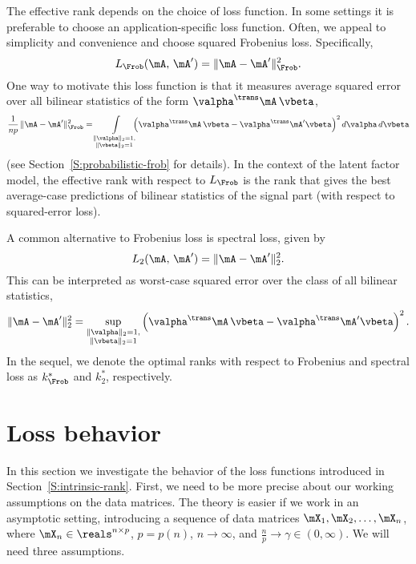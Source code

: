 The effective rank depends on the choice of loss function.  In some settings it is preferable to choose an application-specific loss function.  Often, we appeal to simplicity and convenience and choose squared Frobenius loss.  Specifically,
\[
    L_\Frob ( \mA, \, \mA' )
        = \| \mA - \mA' \|_\Frob^2.
\]
One way to motivate this loss function is that it measures average squared error over all bilinear statistics of the form 
$\valpha^\trans \mA \, \vbeta$,
\[
    \frac{1}{np} \,
    \| \mA - \mA' \|_\Frob^2
    =
    \int\limits_{ \substack{ \| \valpha \|_2 = 1, \\
                             \| \vbeta \|_2  = 1 } }
        \!\!\!\!
        \left(
            \valpha^\trans \mA \, \vbeta
            -
            \valpha^\trans \mA' \vbeta
        \right)^2
        d\valpha \,
        d\vbeta
\]
(see Section~\ref{S:probabilistic-frob} for details).
In the context of the latent factor model, the effective rank with respect
to $L_\Frob$ is the rank that gives the best average-case predictions of 
bilinear statistics of the signal part (with respect to squared-error loss). 

A common alternative to Frobenius loss is spectral loss, given by
\[
    L_2 ( \mA, \, \mA' )
        = \| \mA - \mA' \|_2^2.
\]
This can be interpreted as worst-case squared error over the class of all 
bilinear statistics,
\[
    \| \mA - \mA' \|_2^2
        =
            \sup_{ \substack{ \| \valpha \|_2 = 1, \\
                              \| \vbeta \|_2  = 1 } }
                \left(
                    \valpha^\trans \mA \, \vbeta
                    -
                    \valpha^\trans \mA' \vbeta
                \right)^2.
\]
In the sequel, we denote the optimal ranks with respect to Frobenius and
spectral loss as $k^\ast_\Frob$ and $k^\ast_2$, respectively.


\section{Loss behavior}\label{S:loss-behavior}

In this section we investigate the behavior of the loss functions introduced
in Section~\ref{S:intrinsic-rank}.  First, we need to be more precise about
our working assumptions on the data matrices.  The theory is easier if we
work in an asymptotic setting, introducing a sequence of data matrices
$\mX_1, \mX_2, \ldots, \mX_n$, where $\mX_n \in \reals^{n \times p}$, $p = p(n)$, $n \to \infty$, and $\frac{n}{p} \to \gamma \in (0,\infty)$.  We
will need three assumptions.

